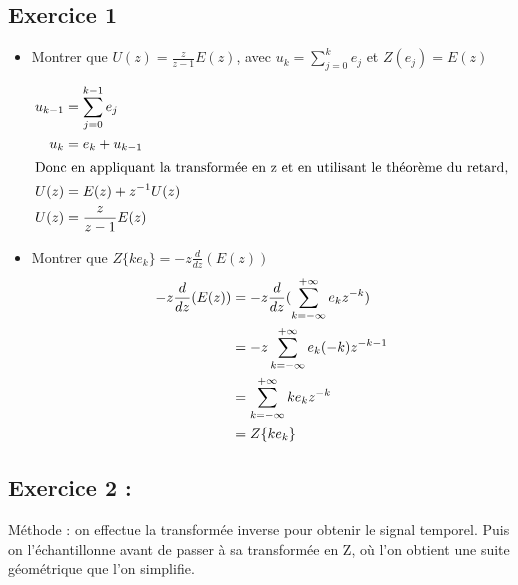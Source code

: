 \documentclass[../main.tex]{subfiles}
\begin{document}
\subsection*{Exercice 1}
\begin{itemize}
\item Montrer que $U(z) = \frac{z}{z-1}E(z)$, avec $u_k = \sum_{j=0}^{k} e_j$ et $Z(e_j) = E(z)$

\begin{align*}
u_{k-1} & = \sum_{j=0}^{k-1}e_j \\
u_k & = e_k+u_{k-1} \\
\intertext{Donc en appliquant la transformée en z et en utilisant le théorème du retard,}
U(z) & = E(z) +z^{-1}U(z) \\
U(z) & = \frac{z}{z-1}E(z)
\end{align*}

\item Montrer que $Z\{ke_k\}=-z\frac{d}{dz}(E(z))$
\begin{align*}
-z\frac{d}{dz}(E(z))&= -z\frac{d}{dz}(\sum_{k=-\infty}^{+\infty} e_kz^{-k})\\
&=-z \sum_{k=-\infty}^{+\infty} e_k(-k)z^{-k-1}\\
&=\sum_{k=-\infty}^{+\infty} ke_kz^{-k}\\
&=Z\{ke_k\}\\
\end{align*}
\end{itemize}

\subsection*{Exercice 2 :}
\noindent Méthode : on effectue la transformée inverse pour obtenir le signal temporel. Puis on l'échantillonne avant de passer à sa transformée en Z, où l'on obtient une suite géométrique que l'on simplifie.\\
\end{document}
